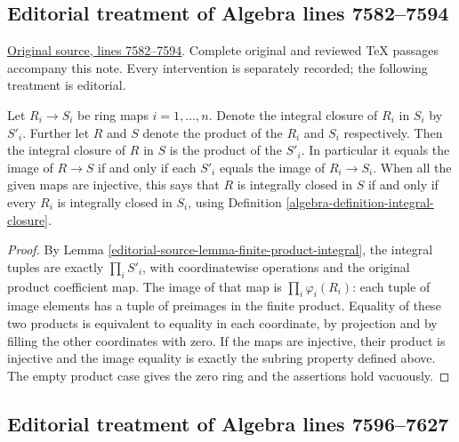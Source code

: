 \subsection{Editorial treatment of Algebra lines 7582--7594}

\hypertarget{algebra-context-074}{}

\noindent\href{https://github.com/stacks/stacks-project/blob/a04446e57ec1fbc252a871afcec7752fb2807b14/algebra.tex\#L7582}{Original source, lines 7582--7594}. Complete original and reviewed TeX passages accompany this note. Every intervention is separately recorded; the following treatment is editorial.


\begin{lemma}
\label{editorial-source-lemma-finite-product-integral-closure}
Let $R_i\to S_i$ be ring maps $i = 1, \ldots, n$.
Denote the integral closure of $R_i$ in $S_i$ by $S'_i$.
Further let $R$ and $S$ denote the product of the $R_i$ and $S_i$ respectively.
Then the integral closure of $R$ in $S$
is the product of the $S'_i$. In particular it equals the image
of $R\to S$ if and only if each $S'_i$ equals the image of
$R_i\to S_i$. When all the given maps are injective, this says
that $R$ is integrally closed in $S$ if and only if every $R_i$
is integrally closed in $S_i$, using Definition \ref{algebra-definition-integral-closure}.
\end{lemma}

\begin{proof}
By Lemma \ref{editorial-source-lemma-finite-product-integral}, the integral tuples
are exactly $\prod_iS'_i$, with coordinatewise operations and the
original product coefficient map. The image of that map is
$\prod_i\varphi_i(R_i)$: each tuple of image elements has a tuple
of preimages in the finite product. Equality of these two products
is equivalent to equality in each coordinate, by projection and
by filling the other coordinates with zero. If the maps are
injective, their product is injective and the image equality is
exactly the subring property defined above. The empty product
case gives the zero ring and the assertions hold vacuously.
\end{proof}


\subsection{Editorial treatment of Algebra lines 7596--7627}

\hypertarget{algebra-context-075}{}

